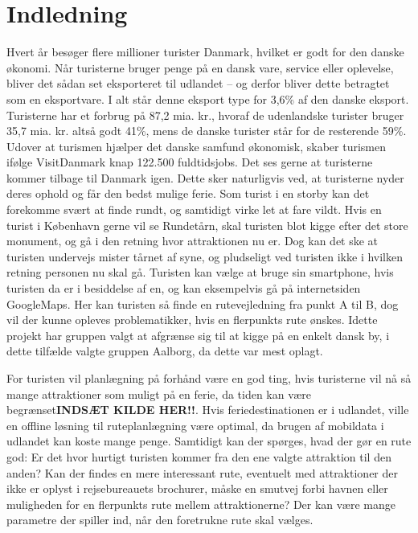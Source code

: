 \chapter{Indledning}

Hvert år besøger flere millioner turister Danmark, hvilket er godt for den danske økonomi. Når turisterne bruger penge på en dansk vare, service eller oplevelse, bliver det sådan set eksporteret til udlandet – og derfor bliver dette betragtet som en eksportvare. I alt står denne eksport type for 3,6\% af den danske eksport. Turisterne har et forbrug på 87,2 mia. kr., hvoraf de udenlandske turister bruger 35,7 mia. kr. altså godt 41\%, mens de danske turister står for de resterende 59\%. Udover at turismen hjælper det danske samfund økonomisk, skaber turismen ifølge VisitDanmark knap 122.500 fuldtidsjobs. \citep{faktaogtalVD}   \newline
Det ses gerne at turisterne kommer tilbage til Danmark igen. Dette sker naturligvis ved, at turisterne nyder deres ophold og får den bedst mulige ferie. Som turist i en storby kan det forekomme svært at finde rundt, og samtidigt virke let at fare vildt. Hvis en turist i København gerne vil se Rundetårn, skal turisten blot kigge efter det store monument, og gå i den retning hvor attraktionen nu er. Dog kan det ske at turisten undervejs mister tårnet af syne, og pludseligt ved turisten ikke i hvilken retning personen nu skal gå. Turisten kan vælge at bruge sin smartphone, hvis turisten da er i besiddelse af en, og kan eksempelvis gå på internetsiden GoogleMaps. Her kan turisten så finde en rutevejledning fra punkt A til B, dog vil der kunne opleves problematikker, hvis en flerpunkts rute ønskes. Idette projekt har gruppen valgt at afgrænse sig til at kigge på en enkelt dansk by, i dette tilfælde valgte gruppen Aalborg, da dette var mest oplagt.  \newline

For turisten vil planlægning på forhånd være en god ting, hvis turisterne vil nå så mange attraktioner som muligt på en ferie, da tiden kan være begrænset\textbf{INDSÆT KILDE HER!!}. Hvis feriedestinationen er i udlandet, ville en offline løsning til ruteplanlægning være optimal, da brugen af mobildata i udlandet kan koste mange penge\citep {TDC}. \newline
Samtidigt kan der spørges, hvad der gør en rute god: Er det hvor hurtigt turisten kommer fra den ene valgte attraktion til den anden? Kan der findes en mere interessant rute, eventuelt med attraktioner der ikke er oplyst i rejsebureauets brochurer, måske en smutvej forbi havnen eller muligheden for en flerpunkts rute mellem attraktionerne? Der kan være mange parametre der spiller ind, når den foretrukne rute skal vælges. \newline

